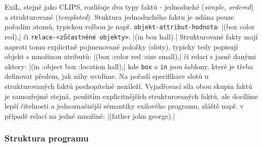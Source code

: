 ExiL, stejně jako CLIPS, rozlišuje dva typy faktů - jednoduché (\emph{simple,
ordered}) a strukturované (\emph{templated}). Stuktura jednoduchého faktu je udána
pouze pořadím atomů, typickou volbou je např. \verb|objekt-attribut-hodnota|:
\cl|(box color red),| či \verb|relace-<zůčastněné objekty>|: \cl|(in box hall).|
Strukturované fakty mají naproti tomu explicitně pojmenované položky (sloty),
typicky tedy popisují objekt s množinou atributů: \cl|(box :color red :size small),|
či relaci s jasně danými aktory: \cl|(in :object box :location hall),| kde
\verb|box| a \verb|in| jsou šablony, které je třeba definovat předem, jak záhy
uvidíme. Na pořadí specifikace slotů u strukturovaných faktů pochopitelně
nezáleží. Vyjadřovací síla obou skupin faktů je samozřejmě stejná, použitím
explicitnějších strukturovaných faktů, ale docílíme lepší čitelnosti a
jednoznačnější sémantiky exilového programu, zláště např. v případě relací na
jedné množině: \cl|(father john george).|

\subsubsection{Struktura programu}


